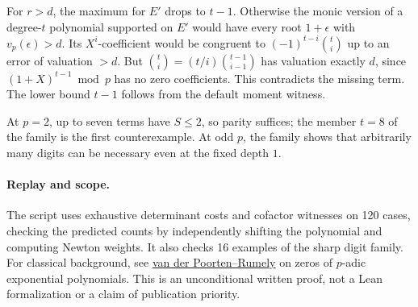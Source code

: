 \documentclass[11pt]{article}
\begin{document}
For \(r>d\), the maximum for \(E'\) drops to \(t-1\).
Otherwise the monic version of a degree-\(t\) polynomial supported
on \(E'\) would have every root \(1+\epsilon\) with \(v_p(\epsilon)>d\).
Its \(X^i\)-coefficient would be congruent to
\((-1)^{t-i}\binom{t}{i}\) up to an error of valuation \(>d\).
But \(\binom{t}{i}=(t/i)\binom{t-1}{i-1}\) has valuation exactly
\(d\), since \((1+X)^{t-1}\bmod p\) has no zero coefficients.
This contradicts the missing term.
The lower bound \(t-1\) follows from the default moment witness.

At \(p=2\), up to seven terms have \(S\le2\), so parity suffices;
the member \(t=8\) of the family is the first counterexample.
At odd \(p\), the family shows that arbitrarily many digits can
be necessary even at the fixed depth \(1\).

\paragraph{Replay and scope.}
The script uses exhaustive determinant costs and cofactor witnesses
on 120 cases, checking the predicted counts by independently shifting
the polynomial and computing Newton weights. It also checks 16 examples
of the sharp digit family. For classical background, see
\href{https://doi.org/10.1112/jlms/s2-36.1.1}{van der Poorten--Rumely}
on zeros of \(p\)-adic exponential polynomials.
This is an unconditional written proof, not a Lean formalization
or a claim of publication priority.
\end{document}
